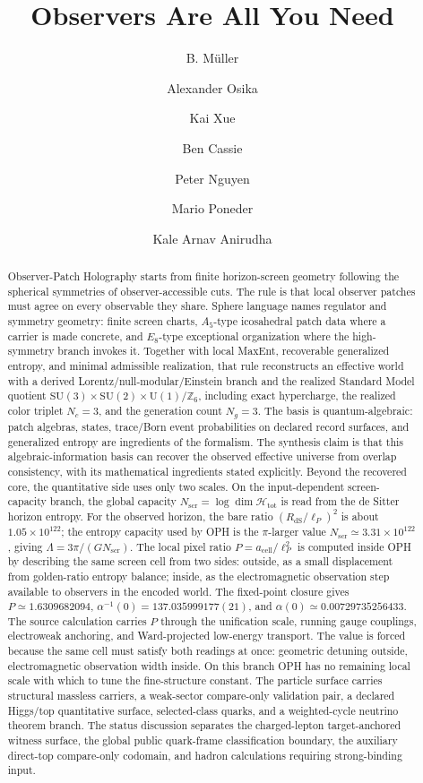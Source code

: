 \documentclass[11pt]{article}
\title{Observers Are All You Need}
\author{B. M\"uller \and Alexander Osika \and Kai Xue \and Ben Cassie \and Peter Nguyen \and Mario Poneder \and Kale Arnav Anirudha}
\date{\OPHPaperReleaseDate}
\newcommand{\SU}{\mathrm{SU}}
\newcommand{\U}{\mathrm{U}}
\begin{document}
\maketitle
\OPHPaperReleaseBanner

\begin{abstract}
Observer-Patch Holography starts from finite horizon-screen geometry following the spherical
symmetries of observer-accessible cuts. The rule is that local observer patches must agree on
every observable they share. Sphere language names regulator and symmetry geometry: finite screen charts,
\(A_5\)-type icosahedral patch data
where a carrier is made concrete, and \(E_8\)-type exceptional organization where the high-symmetry
branch invokes it. Together with local MaxEnt, recoverable
generalized entropy, and minimal admissible realization, that rule reconstructs an effective
world with a derived Lorentz/null-modular/Einstein branch and the realized Standard Model quotient
\(\SU(3)\times\SU(2)\times\U(1)/\mathbb Z_6\), including exact hypercharge, the realized color
triplet \(N_c=3\), and the generation count \(N_g=3\). The basis is quantum-algebraic:
patch algebras, states, trace/Born event probabilities on declared record surfaces, and
generalized entropy are ingredients of the formalism. The synthesis claim is that this
algebraic-information basis can recover the observed effective universe from overlap
consistency, with its mathematical ingredients stated explicitly. Beyond the recovered core, the quantitative side uses only two scales. On the input-dependent
screen-capacity branch, the global capacity \(N_{\mathrm{scr}}=\log\dim\mathcal H_{\mathrm{tot}}\) is read from the de Sitter horizon entropy. For the observed
horizon, the bare ratio \((R_{\mathrm{dS}}/\ell_P)^2\) is about \(1.05\times10^{122}\);
the entropy capacity used by OPH is the \(\pi\)-larger value \(N_{\mathrm{scr}}\simeq
3.31\times10^{122}\), giving \(\Lambda=3\pi/(G N_{\mathrm{scr}})\). The local pixel ratio
\(P=a_{\mathrm{cell}}/\ell_P^2\) is computed inside OPH by describing the same screen cell from two
sides: outside, as a small displacement from golden-ratio entropy balance; inside, as the
electromagnetic observation step available to observers in the encoded world. The fixed-point
closure gives \(P\simeq1.6309682094\),
\(\alpha^{-1}(0)=137.035999177(21)\), and
\(\alpha(0)\simeq0.00729735256433\). The source
calculation carries \(P\) through the unification scale, running gauge couplings,
electroweak anchoring, and Ward-projected low-energy transport. The value
is forced because the same cell must satisfy both readings at once: geometric
detuning outside, electromagnetic observation width inside. On this branch OPH
has no remaining local scale with which to tune the fine-structure constant. The particle
surface carries structural massless carriers, a weak-sector compare-only validation pair, a declared
Higgs/top quantitative surface, selected-class quarks, and a weighted-cycle neutrino theorem branch. The
status discussion separates the charged-lepton target-anchored witness surface, the global public quark-frame
classification boundary, the auxiliary direct-top compare-only codomain, and hadron calculations requiring
strong-binding input.
\end{abstract}
\end{document}
